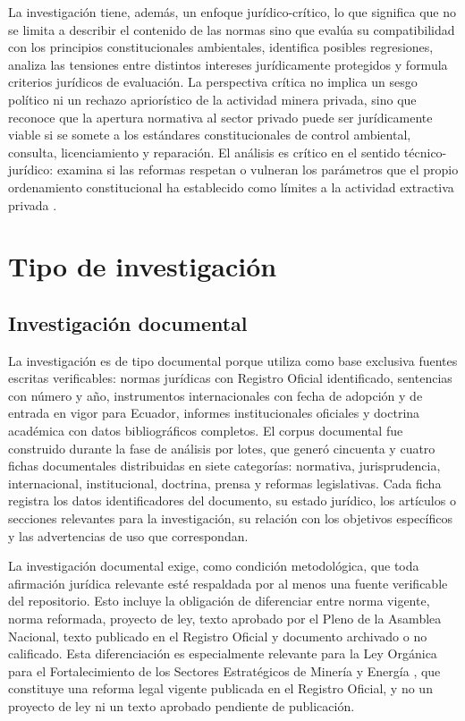 La investigación tiene, además, un enfoque jurídico-crítico, lo que significa que no se limita a describir el contenido de las normas sino que evalúa su compatibilidad con los principios constitucionales ambientales, identifica posibles regresiones, analiza las tensiones entre distintos intereses jurídicamente protegidos y formula criterios jurídicos de evaluación. La perspectiva crítica no implica un sesgo político ni un rechazo apriorístico de la actividad minera privada, sino que reconoce que la apertura normativa al sector privado puede ser jurídicamente viable si se somete a los estándares constitucionales de control ambiental, consulta, licenciamiento y reparación. El análisis es crítico en el sentido técnico-jurídico: examina si las reformas respetan o vulneran los parámetros que el propio ordenamiento constitucional ha establecido como límites a la actividad extractiva privada \parencite{villacis_calvas_2022}.

\section{Tipo de investigación}

\subsection{Investigación documental}

La investigación es de tipo documental porque utiliza como base exclusiva fuentes escritas verificables: normas jurídicas con Registro Oficial identificado, sentencias con número y año, instrumentos internacionales con fecha de adopción y de entrada en vigor para Ecuador, informes institucionales oficiales y doctrina académica con datos bibliográficos completos. El corpus documental fue construido durante la fase de análisis por lotes, que generó cincuenta y cuatro fichas documentales distribuidas en siete categorías: normativa, jurisprudencia, internacional, institucional, doctrina, prensa y reformas legislativas. Cada ficha registra los datos identificadores del documento, su estado jurídico, los artículos o secciones relevantes para la investigación, su relación con los objetivos específicos y las advertencias de uso que correspondan.

La investigación documental exige, como condición metodológica, que toda afirmación jurídica relevante esté respaldada por al menos una fuente verificable del repositorio. Esto incluye la obligación de diferenciar entre norma vigente, norma reformada, proyecto de ley, texto aprobado por el Pleno de la Asamblea Nacional, texto publicado en el Registro Oficial y documento archivado o no calificado. Esta diferenciación es especialmente relevante para la Ley Orgánica para el Fortalecimiento de los Sectores Estratégicos de Minería y Energía \parencite{ley_fortalecimiento_2026}, que constituye una reforma legal vigente publicada en el Registro Oficial, y no un proyecto de ley ni un texto aprobado pendiente de publicación.

